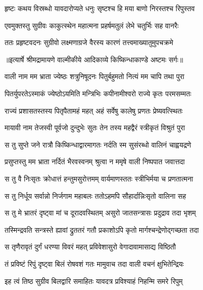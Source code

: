 \twolineshloka
{हृष्टः कथय विस्रब्धो यावदारोप्यते धनुः}
{सृष्टश्च हि मया बाणो निरस्तश्च रिपुस्तव} %

\twolineshloka
{एवमुक्तस्तु सुग्रीवः काकुत्स्थेन महात्मना}
{प्रहर्षमतुलं लेभे चतुर्भिः सह वानरैः} %

\twolineshloka
{ततः प्रहृष्टवदनः सुग्रीवो लक्ष्मणाग्रजे}
{वैरस्य कारणं तत्त्वमाख्यातुमुपचक्रमे} %


{॥इत्यार्षे श्रीमद्रामायणे वाल्मीकीये आदिकाव्ये किष्किन्धाकाण्डे अष्टमः सर्गः॥}


\twolineshloka
{वाली नाम मम भ्राता ज्येष्ठः शत्रुनिषूदनः}
{पितुर्बहुमतो नित्यं मम चापि तथा पुरा} %

\twolineshloka
{पितर्युपरतेऽस्माकं ज्येष्ठोऽयमिति मन्त्रिभिः}
{कपीनामीश्वरो राज्ये कृतः परमसम्मतः} %

\twolineshloka
{राज्यं प्रशासतस्तस्य पितृपैतामहं महत्}
{अहं सर्वेषु कालेषु प्रणतः प्रेष्यवत्स्थितः} %

\twolineshloka
{मायावी नाम तेजस्वी पूर्वजो दुन्दुभेः सुतः}
{तेन तस्य महद्वैरं स्त्रीकृतं विश्रुतं पुरा} %

\twolineshloka
{स तु सुप्ते जने रात्रौ किष्किन्धाद्वारमागतः}
{नर्दति स्म सुसंरब्धो वालिनं चाह्वयद्रणे} %

\twolineshloka
{प्रसुप्तस्तु मम भ्राता नर्दितं भैरवस्वनम्}
{श्रुत्वा न ममृषे वाली निष्पपात जवात्तदा} %

\twolineshloka
{स तु वै निःसृतः क्रोधात्तं हन्तुमसुरोत्तमम्}
{वार्यमाणस्ततः स्त्रीभिर्मया च प्रणतात्मना} %

\twolineshloka
{स तु निर्धूय सर्वान्नो निर्जगाम महाबलः}
{ततोऽहमपि सौहार्दान्निःसृतो वालिना सह} %

\twolineshloka
{स तु मे भ्रातरं दृष्ट्वा मां च दूरादवस्थितम्}
{असुरो जातसन्त्रासः प्रदुद्राव तदा भृशम्} %

\twolineshloka
{तस्मिन्द्रवति सन्त्रस्ते ह्यावां द्रुततरं गतौ}
{प्रकाशोऽपि कृतो मार्गश्चन्द्रेणोद्गच्छता तदा} %

\twolineshloka
{स तृणैरावृतं दुर्गं धरण्या विवरं महत्}
{प्रविवेशासुरो वेगादावामासाद्य विष्ठितौ} %

\twolineshloka
{तं प्रविष्टं रिपुं दृष्ट्वा बिलं रोषवशं गतः}
{मामुवाच तदा वाली वचनं क्षुभितेन्द्रियः} %

\twolineshloka
{इह त्वं तिष्ठ सुग्रीव बिलद्वारि समाहितः}
{यावदत्र प्रविश्याहं निहन्मि समरे रिपुम्} %

